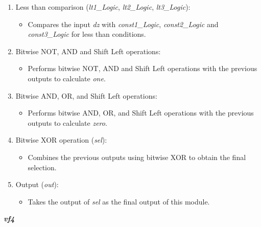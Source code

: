 \documentclass{article}
\begin{document}
\begin{enumerate}

\item Less than comparison (\textit{lt1\_Logic}, \textit{lt2\_Logic}, \textit{lt3\_Logic}):
\begin{itemize}
\item Compares the input \textit{dz} with \textit{const1\_Logic}, \textit{const2\_Logic} and \textit{const3\_Logic} for less than conditions.
\end{itemize}

\item Bitwise NOT, AND and Shift Left operations:
\begin{itemize}
\item Performs bitwise NOT, AND and Shift Left operations with the previous outputs to calculate \textit{one}.
\end{itemize}

\item Bitwise AND, OR, and Shift Left operations:
\begin{itemize}
\item Performs bitwise AND, OR, and Shift Left operations with the previous outputs to calculate \textit{zero}.
\end{itemize}

\item Bitwise XOR operation (\textit{sel}):
\begin{itemize}
\item Combines the previous outputs using bitwise XOR to obtain the final selection.
\end{itemize}

\item Output (\textit{out}):
\begin{itemize}
\item Takes the output of \textit{sel} as the final output of this module.
\end{itemize}

\end{enumerate}

\vspace{0.5cm}

\textbf{\textit{vf4}}
\end{document}
